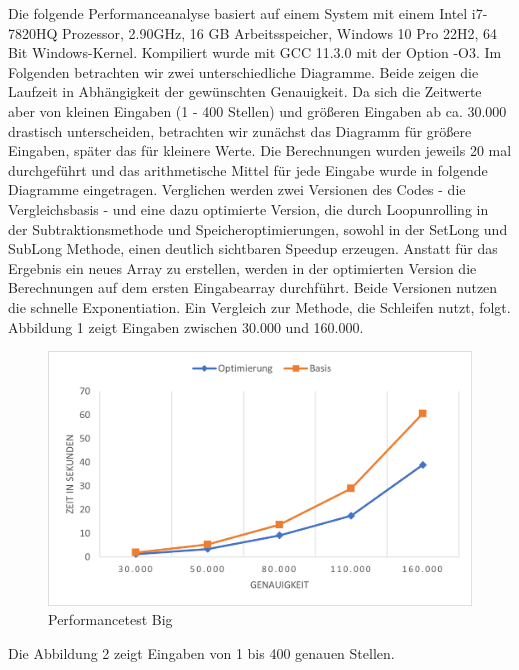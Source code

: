 \documentclass[course=erap]{aspdoc}
\begin{document}
    Die folgende Performanceanalyse basiert auf einem System mit einem Intel i7-7820HQ Prozessor, 2.90GHz, 16 GB Arbeitsspeicher, Windows 10 Pro 22H2, 64 Bit Windows-Kernel. Kompiliert wurde mit GCC 11.3.0 mit der Option -O3. Im Folgenden betrachten wir zwei unterschiedliche Diagramme. Beide zeigen die Laufzeit in Abhängigkeit der gewünschten Genauigkeit. Da sich die Zeitwerte aber von kleinen Eingaben (1 - 400 Stellen) und größeren Eingaben ab ca. 30.000 drastisch unterscheiden, betrachten wir zunächst das Diagramm für größere Eingaben, später das für kleinere Werte. Die Berechnungen wurden jeweils 20 mal durchgeführt und das arithmetische Mittel für jede Eingabe wurde in folgende Diagramme eingetragen. Verglichen werden zwei Versionen des Codes - die Vergleichsbasis - und eine dazu optimierte Version, die durch Loopunrolling in der Subtraktionsmethode und Speicheroptimierungen, sowohl in der SetLong und SubLong Methode, einen deutlich sichtbaren Speedup erzeugen. Anstatt für das Ergebnis ein neues Array zu erstellen, werden in der optimierten Version die Berechnungen auf dem ersten Eingabearray durchführt. Beide Versionen nutzen die schnelle Exponentiation. Ein Vergleich zur Methode, die Schleifen nutzt, folgt. Abbildung 1 zeigt Eingaben zwischen 30.000 und 160.000.
    \begin{figure}[ht]
        \centering
        \includegraphics[scale = 1.0]{Images/PerformanceBig.png}
        \caption{Performancetest Big}
        \label{PerformanceBig}
    \end{figure}
    Die Abbildung 2 zeigt Eingaben von 1 bis 400 genauen Stellen.
\end{document}
